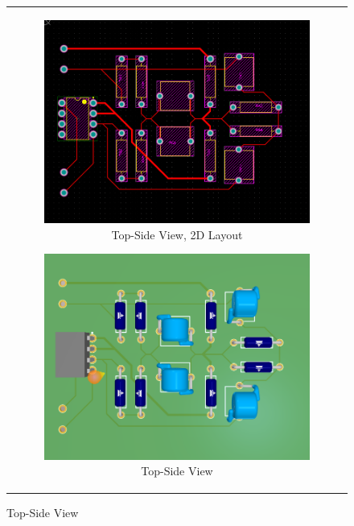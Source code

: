\documentclass[hidelinks,12pt]{article}
\begin{document}
	\begin{figure}[!h]
		\centering
			\begin{tabular}{c}
				\begin{subfigure}[h]{0.5\textwidth}
					\centering
					\includegraphics[width=\textwidth]{figures/altium/top_side_2d}
					\caption{Top-Side View, 2D Layout}
				\end{subfigure}
				\hfill
				\begin{subfigure}[h]{0.5\textwidth}
					\centering
					\includegraphics[width=\textwidth]{figures/altium/top_side_3d}
					\caption{Top-Side View}
				\end{subfigure} \\
				

\end{tabular}
\end{figure}
\end{document}
